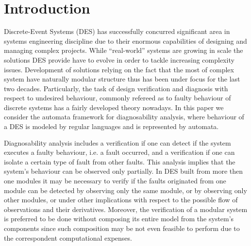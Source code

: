 \documentclass[a4paper, 10pt, conference]{ieeeconf} \IEEEoverridecommandlockouts
\begin{document}
\section{Introduction}

Discrete-Event Systems (DES) has successfully concurred significant area in
systems engineering discipline due to their enormous capabilities of designing
and managing complex projects. While ``real-world'' systems are growing in scale
the solutions DES provide have to evolve in order to tackle increasing
complexity issues. Development of solutions relying on the fact that the most of
complex system have naturally modular structure thus has been under focus for
the last two decades. Particularly, the task of design verification and
diagnosis with respect to undesired behaviour, commonly refereed as to faulty
behaviour of discrete systems has a fairly developed theory nowadays.
In this paper we consider the automata framework for diagnosability analysis,
where behaviour of a DES is modeled by regular languages and is represented by
automata.

Diagnosability analysis includes a verification if one can detect if the system
executes a faulty behaviour, i.e. a fault occurred, and a verification if one
can isolate a certain type of fault from other faults. This analysis implies
that the system's behaviour can be observed only partially. In DES built from more
then one modules it may be necessary to verify if the faults originated from one
module can be detected by observing only the same module, or by observing only
other modules, or under other implications with respect to the possible flow of
observations and their derivatives. Moreover, the verification of a modular
system is preferred to be done without composing its entire model from the
system's components since such composition may be not even feasible to perform
due to the correspondent computational expenses.

\end{document}
